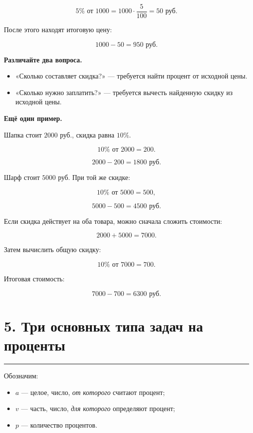 \documentclass[a4paper,12pt]{article}
\newcommand{\sectionrule}{%
  \par
  \vspace{-0.35em}
  {\color{accent}\rule{\linewidth}{0.7pt}}
  \vspace{0.55em}
}
\newcommand{\key}[1]{\textbf{\color{darkaccent}#1}}
\begin{document}
\[
5\%\text{ от }1000
=
1000\cdot\frac{5}{100}
=
50\text{ руб.}
\]

После этого находят итоговую цену:

\[
1000-50=950\text{ руб.}
\]

\key{Различайте два вопроса.}

\begin{itemize}
  \item
  «Сколько составляет скидка?» ---
  требуется найти процент от исходной цены.

  \item
  «Сколько нужно заплатить?» ---
  требуется вычесть найденную скидку
  из исходной цены.
\end{itemize}

\textbf{Ещё один пример.}

Шапка стоит $2000$ руб.,
скидка равна $10\%$.

\[
10\%\text{ от }2000
=
200.
\]

\[
2000-200=1800\text{ руб.}
\]

Шарф стоит $5000$ руб.
При той же скидке:

\[
10\%\text{ от }5000=500,
\]

\[
5000-500=4500\text{ руб.}
\]

Если скидка действует на оба товара,
можно сначала сложить стоимости:

\[
2000+5000=7000.
\]

Затем вычислить общую скидку:

\[
10\%\text{ от }7000=700.
\]

Итоговая стоимость:

\[
7000-700=6300\text{ руб.}
\]


\section*{5. Три основных типа задач на проценты}
\sectionrule

Обозначим:

\begin{itemize}
  \item
  $a$ --- целое, число, \emph{от которого} считают процент;

  \item
  $v$ --- часть, число, \emph{для которого} определяют процент;

  \item
  $p$ --- количество процентов.
\end{itemize}
\end{document}
